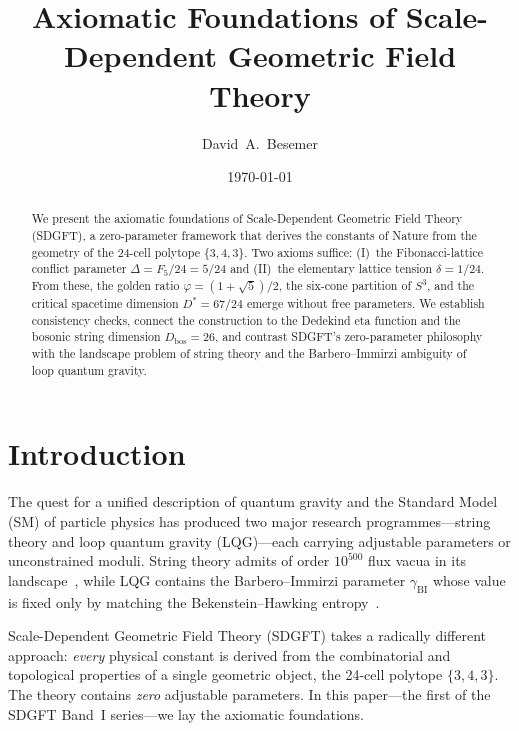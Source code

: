 \documentclass[amsmath,amssymb,aps,prd,twocolumn,superscriptaddress,nofootinbib]{revtex4-2}
\begin{document}

\title{Axiomatic Foundations of Scale-Dependent Geometric Field Theory}

\author{David~A.~Besemer}
\date{\today}

\begin{abstract}
We present the axiomatic foundations of Scale-Dependent Geometric Field Theory
(SDGFT), a zero-parameter framework that derives the constants of Nature from
the geometry of the 24-cell polytope $\{3,4,3\}$.  Two axioms suffice: (I)~the
Fibonacci-lattice conflict parameter $\Delta = F_5/24 = 5/24$ and (II)~the
elementary lattice tension $\delta = 1/24$.  From these, the golden ratio
$\varphi = (1+\sqrt{5})/2$, the six-cone partition of $S^3$, and the critical
spacetime dimension $D^* = 67/24$ emerge without free parameters.  We establish
consistency checks, connect the construction to the Dedekind eta function and
the bosonic string dimension $D_{\text{bos}} = 26$, and contrast SDGFT's
zero-parameter philosophy with the landscape problem of string theory and the
Barbero--Immirzi ambiguity of loop quantum gravity.
\end{abstract}

\maketitle

\section{Introduction}\label{sec:intro}

The quest for a unified description of quantum gravity and the Standard Model
(SM) of particle physics has produced two major research programmes---string
theory and loop quantum gravity (LQG)---each carrying adjustable parameters
or unconstrained moduli.  String theory admits of order $10^{500}$ flux vacua
in its landscape~\cite{Bousso2000,Susskind2003}, while LQG contains the
Barbero--Immirzi parameter $\gamma_{\text{BI}}$ whose value is fixed only by
matching the Bekenstein--Hawking entropy~\cite{Immirzi1997,Rovelli1996}.

Scale-Dependent Geometric Field Theory (SDGFT) takes a radically different
approach: \emph{every} physical constant is derived from the combinatorial and
topological properties of a single geometric object, the 24-cell polytope
$\{3,4,3\}$.  The theory contains \emph{zero} adjustable parameters.  In this
paper---the first of the SDGFT Band~I series---we lay the axiomatic
foundations.
\end{document}
